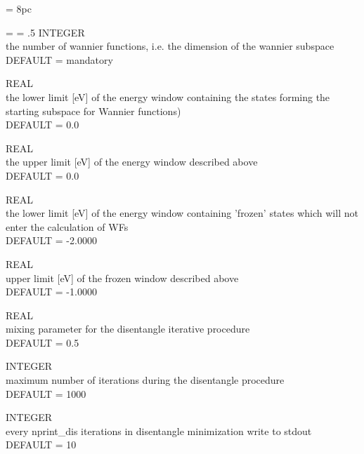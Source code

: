 \newdimen\descindent \descindent = 8pc
{\noindent \leftskip = \descindent \parskip = .5\baselineskip
{}%
INTEGER \\ the number of wannier functions, i.e. the dimension of the wannier subspace
\\ DEFAULT = mandatory \par

\noindent{}%
REAL \\ the lower limit [eV] of the energy window containing the states
forming the starting subspace for Wannier functions)\\ DEFAULT = 0.0 \par

\noindent{}%
REAL \\ the upper limit [eV] of the energy window described above\\ DEFAULT = 0.0 \par

\noindent{}%
REAL \\ the lower limit [eV] of the energy window containing 'frozen' states
which will not enter the calculation of WFs\\ DEFAULT = -2.0000 \par

\noindent{}%
REAL \\ upper limit [eV] of the frozen window described above\\ DEFAULT = -1.0000 \par

\noindent{}%
REAL \\ mixing parameter for the disentangle iterative procedure\\ DEFAULT = 0.5 \par

\noindent{}%
INTEGER \\  maximum number of iterations during the disentangle procedure\\ DEFAULT = 1000 \par

\noindent{}%
INTEGER \\  every nprint\_dis iterations in disentangle minimization write to stdout\\ DEFAULT = 10 \par

}

